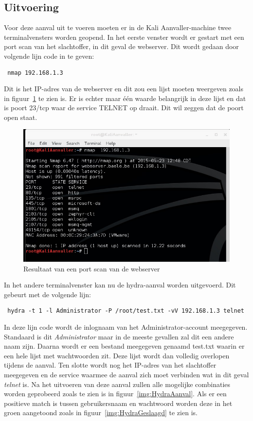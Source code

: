 \documentclass[pdftex,a4paper,12pt]{report}
\begin{document}
\subsection{Uitvoering}
Voor deze aanval uit te voeren moeten er in de Kali Aanvaller-machine twee terminalvensters worden geopend. In het eerste venster wordt er gestart met een port scan van het slachtoffer, in dit geval de webserver. Dit wordt gedaan door volgende lijn code in te geven:
\begin{verbatim} nmap 192.168.1.3 \end{verbatim}
Dit is het IP-adres van de webserver en dit zou een lijst moeten weergeven zoals in figuur~\ref{img:PortScan} te zien is. Er is echter maar één waarde belangrijk in deze lijst en dat is poort 23/tcp waar de service TELNET op draait. Dit wil zeggen dat de poort open staat.

\begin{figure}[H]
\begin{center}
\includegraphics[scale=0.60]{img/HydraPortscan}
\end{center}
\caption{Resultaat van een port scan van de webserver}
\label{img:PortScan}
\end{figure}

In het andere terminalvenster kan nu de hydra-aanval worden uitgevoerd. Dit gebeurt met de volgende lijn:
\begin{verbatim} hydra -t 1 -l Administrator -P /root/test.txt -vV 192.168.1.3 telnet \end{verbatim}
In deze lijn code wordt de inlognaam van het Administrator-account meegegeven. Standaard is dit \textit{Administrator} maar in de meeste gevallen zal dit een andere naam zijn. Daarna wordt er een bestand meegegeven genaamd test.txt waarin er een hele lijst met wachtwoorden zit. Deze lijst wordt dan volledig overlopen tijdens de aanval. Ten slotte wordt nog het IP-adres van het slachtoffer meegegeven en de service waarmee de aanval zich moet verbinden wat in dit geval \textit{telnet} is. Na het uitvoeren van deze aanval zullen alle mogelijke combinaties worden geprobeerd zoals te zien is in figuur~\ref{img:HydraAanval}. Als er een positieve match is tussen gebruikersnaam en wachtwoord worden deze in het groen aangetoond zoals in figuur~\ref{img:HydraGeslaagd} te zien is. \citep{Moon2013}
\end{document}
